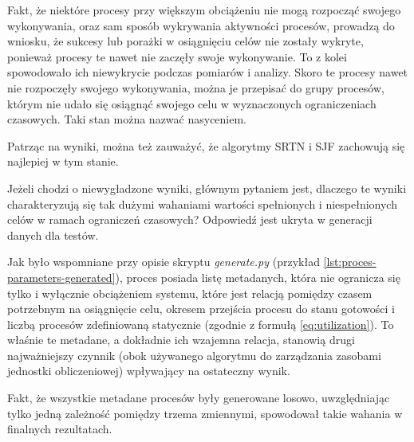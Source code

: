 \documentclass[../../main]{subfiles}
\begin{document}
Fakt, że niektóre procesy przy większym obciążeniu nie mogą rozpocząć swojego wykonywania, oraz sam sposób wykrywania aktywności procesów, prowadzą do wniosku, że sukcesy lub porażki w osiągnięciu celów nie zostały wykryte, ponieważ procesy te nawet nie zaczęły swoje wykonywanie. To z kolei spowodowało ich niewykrycie podczas pomiarów i analizy. Skoro te procesy nawet nie rozpoczęły swojego wykonywania, można je przepisać do grupy procesów, którym nie udało się osiągnąć swojego celu w wyznaczonych ograniczeniach czasowych. Taki stan można nazwać nasyceniem.

\FloatBarrier

Patrząc na wyniki, można też zauważyć, że algorytmy SRTN i SJF zachowują się najlepiej w tym stanie.

Jeżeli chodzi o niewygładzone wyniki, głównym pytaniem jest, dlaczego te wyniki charakteryzują się tak dużymi wahaniami wartości spełnionych i niespełnionych celów w ramach ograniczeń czasowych? Odpowiedź jest ukryta w generacji danych dla testów.

Jak było wspomniane przy opisie skryptu \textit{generate.py} (przykład \ref{lst:proces-parameters-generated}), proces posiada listę metadanych, która nie ogranicza się tylko i wyłącznie obciążeniem systemu, które jest relacją pomiędzy czasem potrzebnym na osiągnięcie celu, okresem przejścia procesu do stanu gotowości i liczbą procesów zdefiniowaną statycznie (zgodnie z formułą \cref{eq:utilization}). To właśnie te metadane, a dokładnie ich wzajemna relacja, stanowią drugi najważniejszy czynnik (obok używanego algorytmu do zarządzania zasobami jednostki obliczeniowej) wpływający na ostateczny wynik.

Fakt, że wszystkie metadane procesów były generowane losowo, uwzględniając tylko jedną zależność pomiędzy trzema zmiennymi, spowodował takie wahania w finalnych rezultatach.
\end{document}
